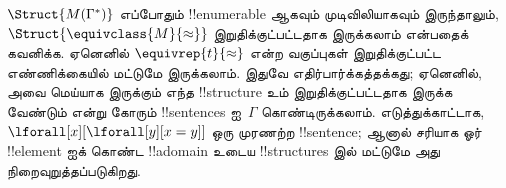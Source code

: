 \documentclass[../../../include/open-logic-section]{subfiles}
\begin{document}
\begin{digress}
$\Struct{M(\Gamma^*)}$ எப்போதும் !!{enumerable} ஆகவும் முடிவிலியாகவும்
இருந்தாலும், $\Struct{\equivclass{M}{\approx}}$ இறுதிக்குட்பட்டதாக இருக்கலாம்
என்பதைக் கவனிக்க. ஏனெனில் $\equivrep{t}{\approx}$ என்ற வகுப்புகள்
இறுதிக்குட்பட்ட எண்ணிக்கையில் மட்டுமே இருக்கலாம். இதுவே எதிர்பார்க்கத்தக்கது;
ஏனெனில், அவை மெய்யாக இருக்கும் எந்த !!{structure} உம் இறுதிக்குட்பட்டதாக
இருக்க வேண்டும் என்று கோரும் !!{sentence}s ஐ~$\Gamma$ கொண்டிருக்கலாம்.
எடுத்துக்காட்டாக, $\lforall[x][\lforall[y][x = y]]$ ஒரு முரணற்ற
!!{sentence}; ஆனால் சரியாக ஓர் !!{element} ஐக் கொண்ட !!a{domain} உடைய
!!{structure}s இல் மட்டுமே அது நிறைவுறுத்தப்படுகிறது.
\end{digress}
\end{document}
